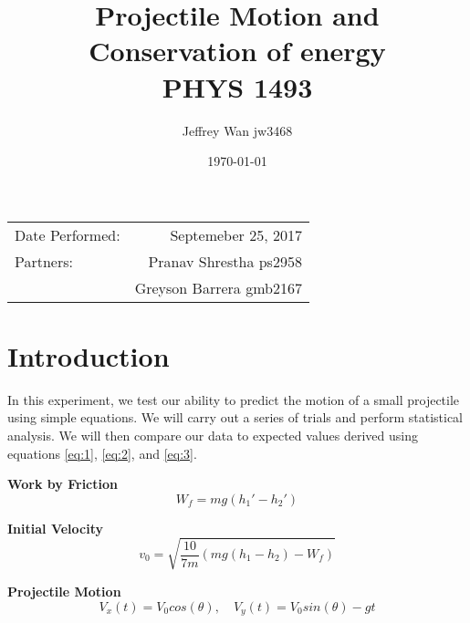 \documentclass{article}
\title{Projectile Motion and Conservation of energy \\ PHYS 1493} %
\author{Jeffrey Wan jw3468} %
\date{\today} %
\begin{document}
\maketitle %

\begin{center}
\begin{tabular}{l r}
Date Performed: & Septemeber 25, 2017 \\ %
Partners: & Pranav Shrestha ps2958\\ %
& Greyson Barrera gmb2167\\
\end{tabular}
\end{center}



\section{Introduction}

In this experiment, we test our ability to predict the motion of a small projectile using simple equations. We will carry out a series of trials and perform statistical analysis. We will then compare our data to expected values derived using equations \eqref{eq:1}, \eqref{eq:2}, and \eqref{eq:3}.

\hspace{1cm}

\textbf{Work by Friction}
\begin{equation}\label{eq:1} 
    W_{f} = mg(h_{1}\ensuremath{'} - h_{2}\ensuremath{'})
\end{equation}

\textbf{Initial Velocity}
\begin{equation}\label{eq:2}
    v_{0} = \sqrt{\frac{10}{7m}(mg(h_{1}-h_{2})-W_{f})}
\end{equation}

\textbf{Projectile Motion}
\begin{equation}\label{eq:3} 
    V_{x}(t) = V_{0} cos(\theta), \quad V_{y}(t) = V_{0} sin(\theta) - gt
\end{equation}
\end{document}
